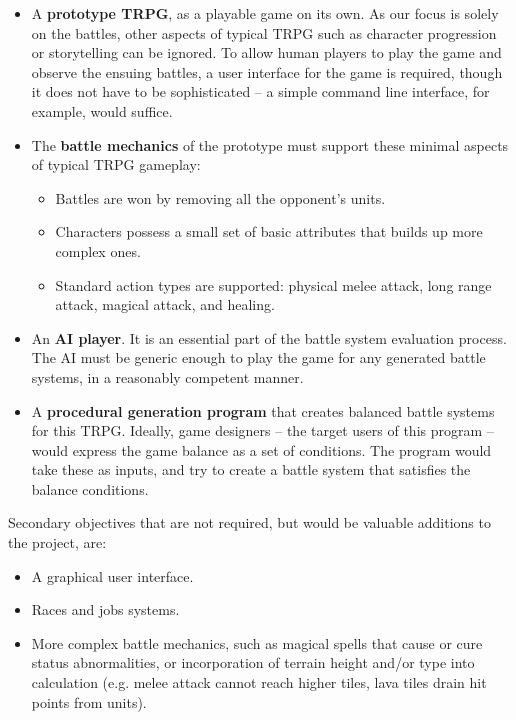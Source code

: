 \begin{itemize}
	\item A \textbf{prototype TRPG}, as a playable game on its own. As our focus is solely on the battles, other aspects of typical TRPG such as character progression or storytelling can be ignored. To allow human players to play the game and observe the ensuing battles, a user interface for the game is required, though it does not have to be sophisticated -- a simple command line interface, for example, would suffice.
	
	\item The \textbf{battle mechanics} of the prototype must support these minimal aspects of typical TRPG gameplay:
	\begin{itemize}
		\item Battles are won by removing all the opponent's units.
		\item Characters possess a small set of basic attributes that builds up more complex ones.
		\item Standard action types are supported: physical melee attack, long range attack, magical attack, and healing.
	\end{itemize}

	\item An \textbf{AI player}. It is an essential part of the battle system evaluation process. The AI must be generic enough to play the game for any generated battle systems, in a reasonably competent manner.
	
	\item A \textbf{procedural generation program} that creates balanced battle systems for this TRPG. Ideally, game designers -- the target users of this program -- would express the game balance as a set of conditions. The program would take these as inputs, and try to create a battle system that satisfies the balance conditions.
	
\end{itemize} 

Secondary objectives that are not required, but would be valuable additions to the project, are:
\begin{itemize}
	\item A graphical user interface.
	\item Races and jobs systems.
	\item More complex battle mechanics, such as magical spells that cause or cure status abnormalities, or incorporation of terrain height and/or type into calculation (e.g. melee attack cannot reach higher tiles, lava tiles drain hit points from units). 
\end{itemize}

